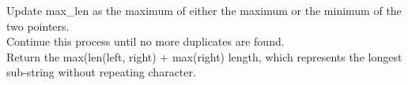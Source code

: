\documentclass[preview]{standalone}
\begin{document}
Update max_len as the maximum of either the maximum or the minimum of the two pointers.\\Continue this process until no more duplicates are found.\\Return the max(len(left, right) + max(right) length, which represents the longest sub-string without repeating character.\\
\end{document}
